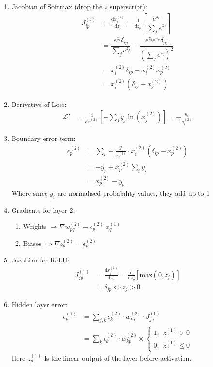 \documentclass{article}
\begin{document}
\begin{enumerate}
    \item Jacobian of Softmax (drop the $z$ superscript): 
    \begin{align*}
    J_{ip}^{(2)} &= \frac{\mathrm{d}x_i^{(2)}}{\mathrm dz_p} = \frac{\mathrm{d}}{\mathrm dz_p}\left[\dfrac{e^{z_i}}{\sum_j e^{z_j}}\right]\\
    &= \dfrac{e^{z_i}\delta_{ip}}{\sum_j e^{z_j}} - \dfrac{e^{z_i}e^{z_p}\delta_{pj}}{\left(\sum_j e^{z_j}\right)^2}\\
    &= x_i^{(2)}\delta_{ip} - x_i^{(2)}x_p^{(2)}\\
    &= x_i^{(2)}\left(\delta_{ip}- x_p^{(2)}\right)
    \end{align*}
    
    \item Derivative of Loss: 
    \begin{align*}
        \mathcal{L}' &= \frac{\mathrm{d}}{\mathrm dx_i^{(2)}}\left[-\sum_j y_j \ln(x_j^{(2)})\right]= -\frac{y_i}{x_i^{(2)}} 
    \end{align*}
    \item Boundary error term: 
    \begin{align*}
        \epsilon_p^{(2)} &= \sum_i -\frac{y_i}{x_i^{(2)}}\cdot x_i^{(2)}\left(\delta_{ip}- x_p^{(2)}\right)\\
        &= -y_p +x_p^{(2)}\sum_i y_i\\
        &= x_p^{(2)} - y_p
    \end{align*}
    Where since $y_i$ are normalised probability values, they add up to 1

    \item Gradients for layer 2:
    \begin{enumerate}
        \item Weights ${\Rightarrow\nabla w_{pq}^{(2)}} = \epsilon_p^{(2)}\;x_q^{(1)}$
    \item Biases $\Rightarrow{\nabla{b}_p^{(2)}} = \epsilon_p^{(2)}$
    \end{enumerate}
    
    \item Jacobian for ReLU:
    \begin{align*}
    J_{jp}^{(1)} &= \frac{\mathrm{d}x_j^{(1)}}{\mathrm dz_p} = \frac{\mathrm{d}}{\mathrm dz_p}\left[\text{max}(0, z_j)\right]\\
    & = \delta_{jp} \iff z_j>0
    \end{align*}

    \item Hidden layer error: 
    \begin{align*}
        \epsilon_p^{(1)}&=\sum_{j,k}\epsilon_k^{(2)}\cdot w_{kj}^{(2)}\cdot J_{j p}^{(1)}\\
        &= \sum_{k}\epsilon_k^{(2)}\cdot w_{kp}^{(2)}\times \left\{\begin{array}{c}
1 ;\ \  z_p^{(1)}>0\\ 0;\ \ z_p^{(1)}\leq0  \end{array} \right.
    \end{align*}
    Here $z_p^{(1)}$ Is the linear output of the layer before activation.


\end{enumerate}
\end{document}
